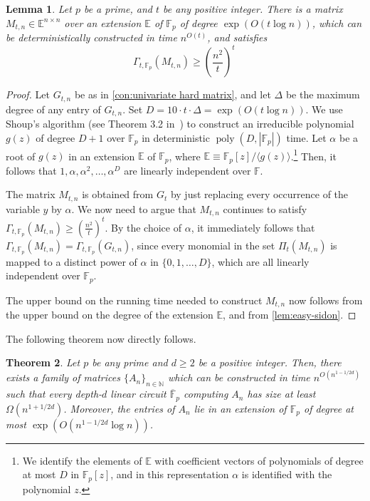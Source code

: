 \documentclass[10pt,a4paper]{article}
\newtheorem{theorem}{Theorem}
\newtheorem{lemma}[theorem]{Lemma}
\newcommand{\F}{\mathbb F}
\newcommand{\E}{\mathbb E}
\newcommand{\N}{\mathbb N}
\newcommand{\inparen}[1]{\left(#1\right)}
\DeclareMathOperator{\poly}{poly}
\begin{document}
\begin{lemma}
\label{lem:hard-over-finite}
Let $p$ be a prime, and $t $ be any positive integer. There is a matrix $M_{t,n} \in \E^{n\times n}$ over an extension $\E$ of $\F_p$ of degree $\exp\inparen{{O(t\log n)}}$, which can be deterministically constructed in time $n^{O(t)}$, and satisfies
\[
\Gamma_{t, \F_p}(M_{t,n}) \geq \left(\frac{n^2}{t}\right)^t\, 
\] 
\end{lemma}
\begin{proof}
Let $G_{t,n}$ be as in \autoref{con:univariate hard matrix}, and let $\Delta$ be the maximum degree of any entry of $G_{t,n}$. Set $D = 10\cdot t\cdot \Delta = \exp\left(O(t\log n)\right)$. We use Shoup's algorithm (see Theorem 3.2 in~\cite{Shoup90}) to construct an irreducible polynomial $g(z)$ of degree $D+1$ over $\F_p$ in deterministic  $\poly(D, |\F_p|)$ time. Let $\alpha$ be a root of $g(z)$ in an extension $\E$ of $\F_p$, where $\E \equiv \F_p[z]/\langle g(z) \rangle$.\footnote{We identify the elements of $\E$ with coefficient vectors of polynomials of degree at most $D$ in $\F_p[z]$, and in this representation $\alpha$ is identified with the polynomial $z$.} Then, it follows that $1, \alpha, \alpha^2, \ldots, \alpha^{D}$ are linearly independent over $\F$.

The matrix $M_{t,n}$ is obtained from $G_t$ by just replacing every occurrence of the variable $y$ by $\alpha$. We now need to argue that $M_{t,n}$ continues to satisfy $\Gamma_{t, \F_p}(M_{t,n}) \geq \left(\frac{n^2}{t}\right)^t$. By the choice of $\alpha$, it immediately follows that $\Gamma_{t, \F_p}(M_{t,n}) = \Gamma_{t, \F_p}(G_{t,n})$, since every monomial in the set $\Pi_t(M_{t,n})$ is mapped to a distinct power of $\alpha$ in $\{0, 1, \ldots, D\}$, which are all linearly independent over $\F_p$.

The upper bound on the running time needed to construct $M_{t,n}$ now follows from the upper bound on the degree of the extension $\E$, and from \autoref{lem:easy-sidon}.
\end{proof}
The following theorem now directly follows.

\begin{theorem}\label{thm:depth-d-finite}
Let $p$ be any prime and $d\geq 2$ be a positive integer. Then, there exists a family of matrices $\{A_n\}_{n \in \N}$ which can be constructed in time $n^{O(n^{1-1/2d})}$ such that every depth-$d$ linear circuit $\overline{\F}_p$ computing $A_n$ has size at least $\Omega(n^{1 + 1/2d})$. Moreover, the entries of $A_n$ lie in an extension of $\F_p$ of degree at most $\exp(O(n^{1-1/2d}\log n))$. 
\end{theorem}
\end{document}
